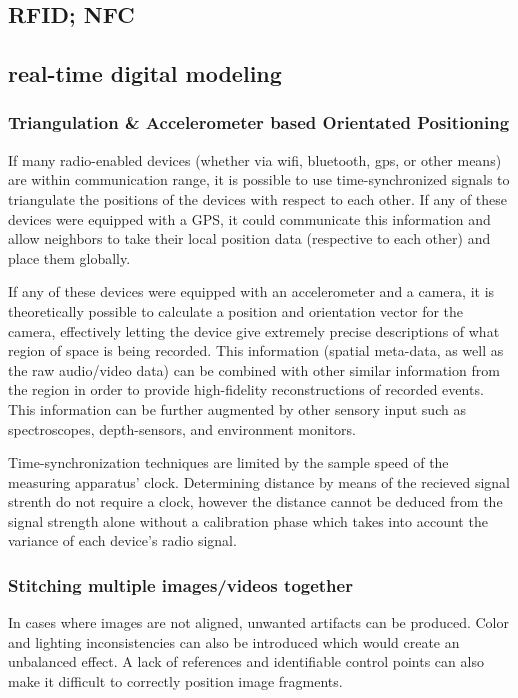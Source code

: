 \documentclass[a4paper,12pt]{report}
\begin{document}
\subsection{RFID; NFC}
\cite{5340296}
\subsection{real-time digital modeling}

\subsubsection{Triangulation \& Accelerometer based Orientated Positioning}

If many radio-enabled devices (whether via wifi, bluetooth, gps, or other means) are within communication range, it is possible to use time-synchronized signals to triangulate the positions of the devices with respect to each other. If any of these devices were equipped with a GPS, it could communicate this information and allow neighbors to take their local position data (respective to each other) and place them globally.

If any of these devices were equipped with an accelerometer and a camera, it is theoretically possible to calculate a position and orientation vector for the camera, effectively letting the device give extremely precise descriptions of what region of space is being recorded. This information (spatial meta-data, as well as the raw audio/video data) can be combined with other similar information from the region in order to provide high-fidelity reconstructions of recorded events. This information can be further augmented by other sensory input such as spectroscopes, depth-sensors, and environment monitors.

Time-synchronization techniques are limited by the sample speed of the measuring apparatus' clock. Determining distance by means of the recieved signal strenth do not require a clock, however the distance cannot be deduced from the signal strength alone without a calibration phase which takes into account the variance of each device's radio signal.

\subsubsection{Stitching multiple images/videos together}
In cases where images are not aligned, unwanted artifacts can be produced. Color and lighting inconsistencies can also be introduced which would create an unbalanced effect. A lack of references and identifiable control points can also make it difficult to correctly position image fragments. \cite{4359344}
\end{document}
